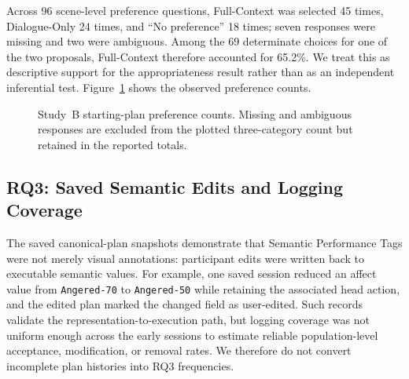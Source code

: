 Across 96 scene-level preference questions, Full-Context was selected 45 times, Dialogue-Only 24 times, and ``No preference'' 18 times; seven responses were missing and two were ambiguous. Among the 69 determinate choices for one of the two proposals, Full-Context therefore accounted for 65.2\%. We treat this as descriptive support for the appropriateness result rather than as an independent inferential test. Figure~\ref{fig:study-b-preference} shows the observed preference counts.

\begin{figure}[t]
    \centering
    
    \caption{Study~B starting-plan preference counts. Missing and ambiguous responses are excluded from the plotted three-category count but retained in the reported totals.}
    \label{fig:study-b-preference}
\end{figure}

\subsection{RQ3: Saved Semantic Edits and Logging Coverage}

The saved canonical-plan snapshots demonstrate that Semantic Performance Tags were not merely visual annotations: participant edits were written back to executable semantic values. For example, one saved session reduced an affect value from \texttt{Angered-70} to \texttt{Angered-50} while retaining the associated head action, and the edited plan marked the changed field as user-edited. Such records validate the representation-to-execution path, but logging coverage was not uniform enough across the early sessions to estimate reliable population-level acceptance, modification, or removal rates. We therefore do not convert incomplete plan histories into RQ3 frequencies.
